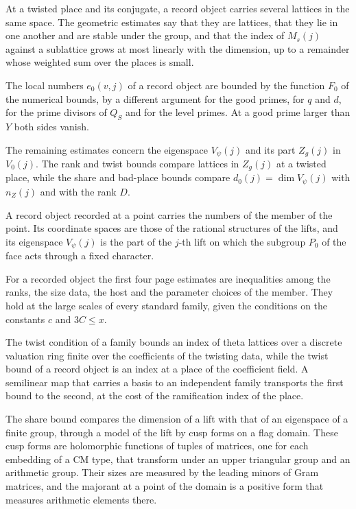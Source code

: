 At a twisted place and its conjugate, a record object carries several lattices in the same space.
The geometric estimates say that they are lattices, that they lie in one another and are stable under
the group, and that the index of $M_s(j)$ against a sublattice grows at most linearly with the
dimension, up to a remainder whose weighted sum over the places is small.

The local numbers $e_0(v,j)$ of a record object are bounded by the function $F_0$ of the numerical
bounds, by a different argument for the good primes, for $q$ and $d$, for the prime divisors of $Q_S$
and for the level primes. At a good prime larger than $Y$ both sides vanish.

The remaining estimates concern the eigenspace $V_\psi(j)$ and its part $Z_g(j)$ in $V_0(j)$. The
rank and twist bounds compare lattices in $Z_g(j)$ at a twisted place, while the share and bad-place
bounds compare $d_0(j)=\dim V_\psi(j)$ with $n_Z(j)$ and with the rank $D$.

A record object recorded at a point carries the numbers of the member of the point. Its coordinate
spaces are those of the rational structures of the lifts, and its eigenspace $V_\psi(j)$ is the part
of the $j$-th lift on which the subgroup $P_0$ of the face acts through a fixed character.

For a recorded object the first four page estimates are inequalities among the ranks, the size data,
the host and the parameter choices of the member. They hold at the large scales of every standard
family, given the conditions on the constants $c$ and $3C\le x$.

The twist condition of a family bounds an index of theta lattices over a discrete valuation ring
finite over the coefficients of the twisting data, while the twist bound of a record object is an
index at a place of the coefficient field. A semilinear map that carries a basis to an independent
family transports the first bound to the second, at the cost of the ramification index of the
place.

The share bound compares the dimension of a lift with that of an eigenspace of a finite group, through
a model of the lift by cusp forms on a flag domain. These cusp forms are holomorphic functions of
tuples of matrices, one for each embedding of a CM type, that transform under an upper triangular
group and an arithmetic group. Their sizes are measured by the leading minors of Gram matrices, and
the majorant at a point of the domain is a positive form that measures arithmetic elements there.

